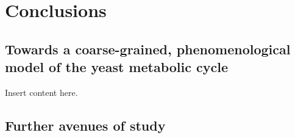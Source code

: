 \chapter{Conclusions}

\section{Towards a coarse-grained, phenomenological model of the yeast metabolic cycle}

Insert content here.

\section{Further avenues of study}
